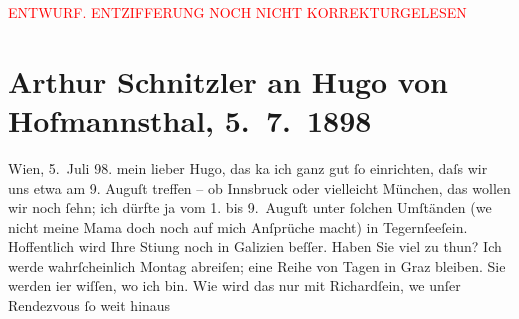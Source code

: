 
\begin{center}
            \textcolor{red}{ENTWURF. ENTZIFFERUNG NOCH NICHT KORREKTURGELESEN}
                      \end{center}
            
               \section[Arthur Schnitzler an Hugo von Hofmannsthal, 5. 7. 1898]{ Arthur Schnitzler an Hugo von Hofmannsthal, 5. 7. 1898}\nopagebreak{}\rehead{ }\begin{ledgroupsized}[t]{13cm}\normalsize\beginnumbering{} \toendnotes[C]{\smallbreak\pagebreak[2]} 
\toendnotes[C]{\smallbreak}\pstart
           \raggedleft{}{\pb}Wien, 5. Juli 98.\pend
           \pstart
           mein lieber Hugo, das ka{\geminationn} ich ganz
                    gut ſo einrichten, daſs wir uns etwa am 9. Auguſt treffen – ob Innsbruck oder vielleicht München, das wollen wir noch ſehn; ich dürfte ja vom
                        1. bis 9. Auguſt unter ſolchen Umſtänden (we{\geminationn} nicht meine Mama doch noch auf mich Anſprüche macht) in Tegernſeeſein. Hoffentlich wird Ihre Sti{\geminationm}ung {\pb}noch in Galizien beſſer. Haben Sie viel zu thun?\pend
           \pstart
           Ich werde wahrſcheinlich Montag abreiſen; eine Reihe von Tagen in
                        Graz bleiben. Sie werden i{\geminationm}er wiſſen, wo ich bin. Wie wird das nur mit Richardſein, we{\geminationn} unſer Rendezvous ſo weit hinaus

\end{ledgroupsized}
